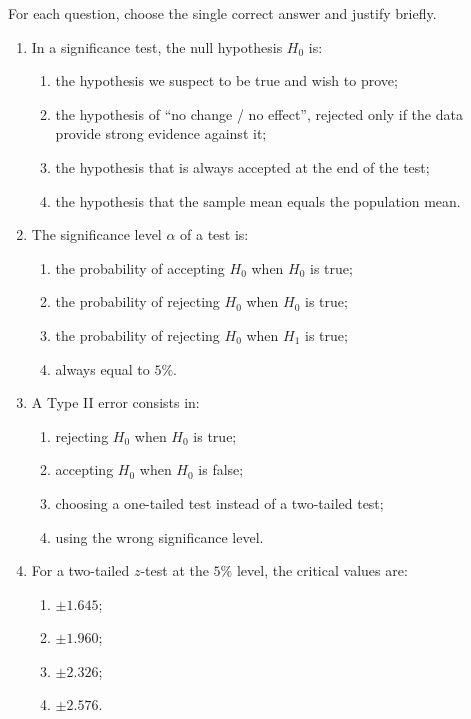 \documentclass[11pt]{article}
\begin{document}
\begin{exercice}
For each question, choose the single correct answer and justify briefly.
\begin{enumerate}
\item In a significance test, the null hypothesis $H_0$ is:
\begin{enumerate}
\item the hypothesis we suspect to be true and wish to prove;
\item the hypothesis of ``no change / no effect'', rejected only if the data provide strong evidence against it;
\item the hypothesis that is always accepted at the end of the test;
\item the hypothesis that the sample mean equals the population mean.
\end{enumerate}
\item The significance level $\alpha$ of a test is:
\begin{enumerate}
\item the probability of accepting $H_0$ when $H_0$ is true;
\item the probability of rejecting $H_0$ when $H_0$ is true;
\item the probability of rejecting $H_0$ when $H_1$ is true;
\item always equal to $5\%$.
\end{enumerate}
\item A Type II error consists in:
\begin{enumerate}
\item rejecting $H_0$ when $H_0$ is true;
\item accepting $H_0$ when $H_0$ is false;
\item choosing a one-tailed test instead of a two-tailed test;
\item using the wrong significance level.
\end{enumerate}
\item For a two-tailed $z$-test at the $5\%$ level, the critical values are:
\begin{enumerate}
\item $\pm 1.645$;
\item $\pm 1.960$;
\item $\pm 2.326$;
\item $\pm 2.576$.
\end{enumerate}
\end{enumerate}
\end{exercice}
\end{document}

